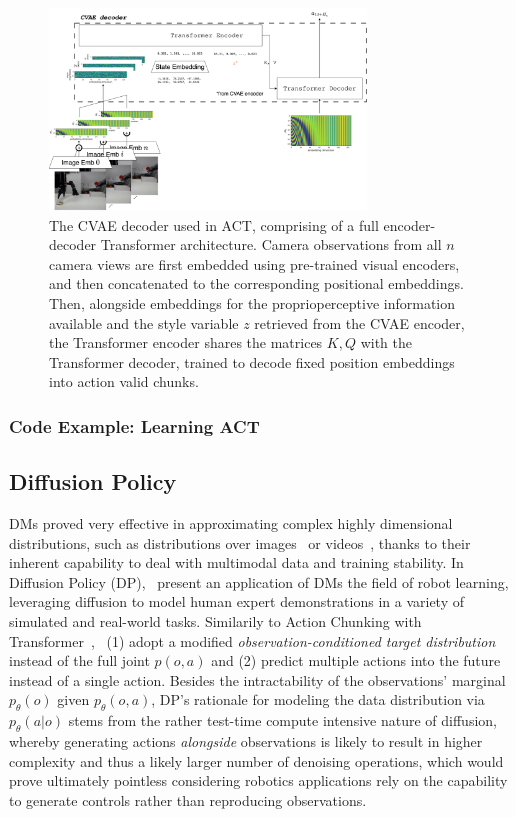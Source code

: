 \begin{figure}
    \centering
    \includegraphics[width=0.75\textwidth]{figures/ch4/ch4-act-decoder.png}
    \caption{The CVAE decoder used in ACT, comprising of a full encoder-decoder Transformer architecture. Camera observations from all \( n \) camera views are first embedded using pre-trained visual encoders, and then concatenated to the corresponding positional embeddings. Then, alongside embeddings for the proprioperceptive information available and the style variable \(z\) retrieved from the CVAE encoder, the Transformer encoder shares the matrices \( K,Q \) with the Transformer decoder, trained to decode fixed position embeddings into action valid chunks.}
    \label{fig:ch4-act-decoder}
\end{figure}


\subsubsection{Code Example: Learning ACT}

\subsection{Diffusion Policy}
DMs proved very effective in approximating complex highly dimensional distributions, such as distributions over images~\citep{hoDenoisingDiffusionProbabilistic2020} or videos~\citep{polyakMovieGenCast2025}, thanks to their inherent capability to deal with multimodal data and training stability.
In Diffusion Policy (DP),~\citet{chiDiffusionPolicyVisuomotor2024} present an application of DMs the field of robot learning, leveraging diffusion to model human expert demonstrations in a variety of simulated and real-world tasks.
Similarily to Action Chunking with Transformer~\citep{zhaoLearningFineGrainedBimanual2023},~\citet{chiDiffusionPolicyVisuomotor2024} (1) adopt a modified \emph{observation-conditioned target distribution} instead of the full joint \( p(o,a) \) and (2) predict multiple actions into the future instead of a single action.
Besides the intractability of the observations' marginal \( p_\theta(o) \) given \(p_\theta(o,a) \), DP's rationale for modeling the data distribution via \( p_\theta(a \vert o) \) stems from the rather test-time compute intensive nature of diffusion, whereby generating actions \emph{alongside} observations is likely to result in higher complexity and thus a likely larger number of denoising operations, which would prove ultimately pointless considering robotics applications rely on the capability to generate controls rather than reproducing observations.

